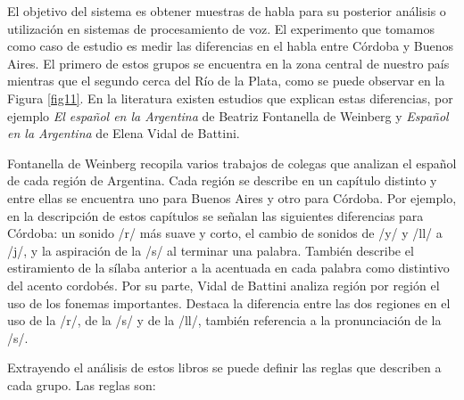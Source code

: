 El objetivo del sistema es obtener muestras de habla para su posterior análisis o utilización en sistemas de procesamiento de voz. El experimento que tomamos como caso de estudio es medir las diferencias en el habla entre Córdoba y Buenos Aires. El primero de estos grupos se encuentra en la zona central de nuestro país mientras que el segundo cerca del Río de la Plata, como se puede observar en la Figura \ref{fig11}. En la literatura existen estudios que explican estas diferencias, por ejemplo \textit{El español en la Argentina} \cite{Fontanella2000} de Beatriz Fontanella de Weinberg y \textit{Español en la Argentina} \cite{Vidal1964} de Elena Vidal de Battini. 

Fontanella de Weinberg recopila varios trabajos de colegas que analizan el español de cada región de Argentina. Cada región se describe en un capítulo distinto y entre ellas se encuentra uno para Buenos Aires y otro para Córdoba. Por ejemplo, en la descripción de estos capítulos se señalan las siguientes diferencias para Córdoba: un sonido /r/ más suave y corto, el cambio de sonidos de /y/ y /ll/ a /j/, y la aspiración de la /s/ al terminar una palabra. También describe el estiramiento de la sílaba anterior a la acentuada en cada palabra como distintivo del acento cordobés. Por su parte, Vidal de Battini analiza región por región el uso de los fonemas importantes. Destaca la diferencia entre las dos regiones en el uso de la /r/, de la /s/ y de la /ll/, también referencia a la pronunciación de la /s/.

Extrayendo el análisis de estos libros se puede definir las reglas que describen a cada grupo. Las reglas son: 

